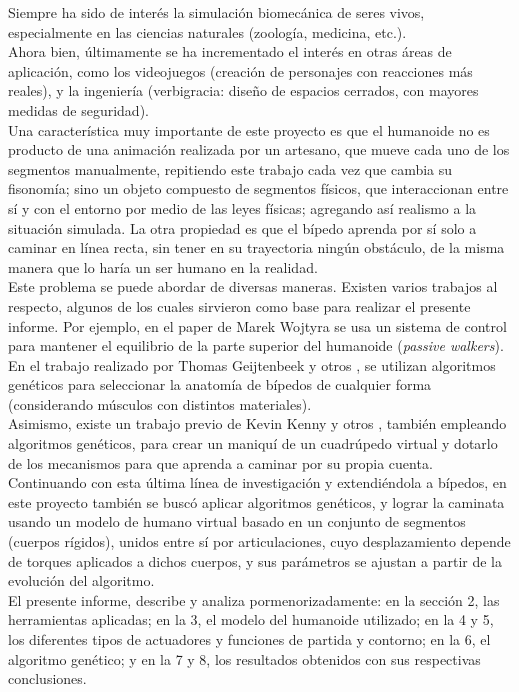\documentclass{article}
\begin{document}
Siempre ha sido de inter\'es la simulaci\'on biomec\'anica de seres vivos, especialmente en las ciencias naturales (zoolog\'ia, medicina, etc.). \\
Ahora bien, \'ultimamente se ha incrementado el inter\'es en otras \'areas de aplicaci\'on, como los videojuegos (creaci\'on de personajes con reacciones m\'as reales), y la ingenier\'ia (verbigracia: dise\~no de espacios cerrados, con mayores medidas de seguridad).\\
Una caracter\'istica muy importante de este proyecto es que el humanoide no es producto de una animaci\'on realizada por un artesano, que mueve cada uno de los segmentos manualmente, repitiendo este trabajo cada vez que cambia su fisonom\'ia; sino un objeto compuesto de segmentos f\'isicos, que interaccionan entre s\'i y con el entorno por medio de las leyes f\'isicas; agregando as\'i realismo a la situaci\'on simulada.  La otra propiedad es que el b\'ipedo aprenda por s\'i solo a caminar en l\'inea recta, sin tener en su trayectoria ning\'un obst\'aculo, de la misma manera que lo har\'ia un ser humano en la realidad.\\
Este problema se puede abordar de diversas maneras. Existen varios trabajos al respecto, algunos de los cuales sirvieron como base para realizar el presente informe. Por ejemplo, en el paper de Marek Wojtyra\cite{Wojtyra} se usa un sistema de control para mantener el equilibrio de la parte superior del humanoide (\textit{passive walkers}). \\
En el trabajo realizado por Thomas Geijtenbeek y otros \cite{flexibleMuscle}, se utilizan algoritmos gen\'eticos para seleccionar la anatom\'ia de b\'ipedos de cualquier forma (considerando m\'usculos con distintos materiales). \\
Asimismo, existe un trabajo previo de Kevin Kenny y otros \cite{Cuadrupedo}, tambi\'en empleando algoritmos gen\'eticos, para crear un maniqu\'i de un cuadr\'upedo virtual y dotarlo de los mecanismos para que aprenda a caminar por su propia cuenta. \\
Continuando con esta \'ultima l\'inea de investigaci\'on y extendi\'endola a b\'ipedos, en este proyecto tambi\'en se busc\'o aplicar algoritmos gen\'eticos, y lograr la caminata usando un modelo de humano virtual basado en un conjunto de segmentos (cuerpos r\'igidos), unidos entre s\'i por articulaciones, cuyo desplazamiento depende de torques aplicados a dichos cuerpos, y sus par\'ametros se ajustan a partir de la evoluci\'on del algoritmo. \\
El presente informe, describe y analiza pormenorizadamente: en la secci\'on 2, las herramientas aplicadas; en la 3, el modelo del humanoide utilizado; en la 4 y 5, los diferentes tipos de actuadores y funciones de partida y contorno; en la 6, el algoritmo gen\'etico; y en la 7 y 8, los resultados obtenidos con sus respectivas conclusiones.
\end{document}
